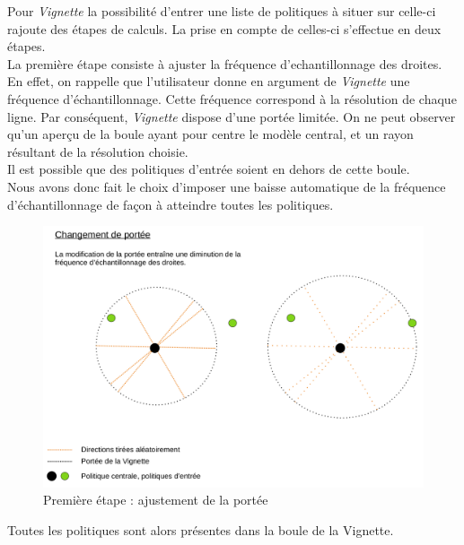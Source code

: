 \documentclass[12pt]{article}
\begin{document}
Pour \emph{Vignette} la possibilité d'entrer une liste de politiques à situer sur celle-ci rajoute des étapes de calculs. La prise en compte de celles-ci s'effectue en deux étapes. \\

La première étape consiste à ajuster la fréquence d'echantillonnage des droites. \\

En effet, on rappelle que l'utilisateur donne en argument de \emph{Vignette} une fréquence d'échantillonnage. Cette fréquence correspond à la résolution de chaque ligne. Par conséquent, \emph{Vignette} dispose d'une portée limitée. On ne peut observer qu'un aperçu de la boule ayant pour centre le modèle central, et un rayon résultant de la résolution choisie. \\

Il est possible que des politiques d'entrée soient en dehors de cette boule. \\

Nous avons donc fait le choix d'imposer une baisse automatique de la fréquence d'échantillonnage de façon à atteindre toutes les politiques. \\
 
\begin{figure}[htp]
    \centering
    \includegraphics[width=15cm]{Images/vignette_portee1}
    \caption{Première étape : ajustement de la portée}
    \label{fig:vignettePortee}
\end{figure}

Toutes les politiques sont alors présentes dans la boule de la Vignette. \\
\end{document}
